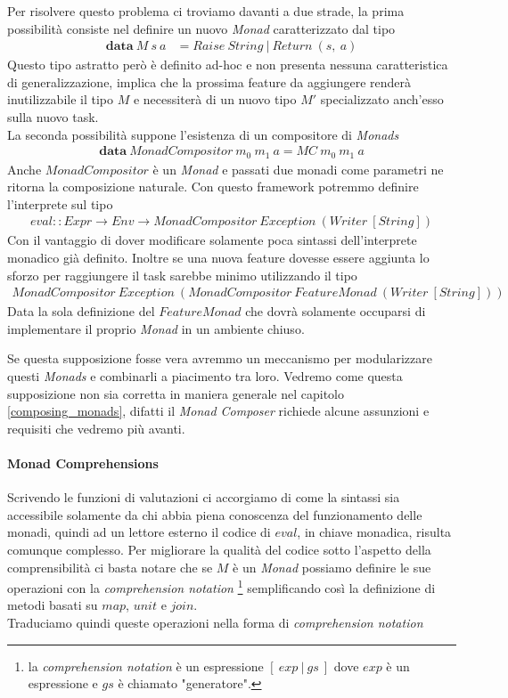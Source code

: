 Per risolvere questo problema ci troviamo davanti a due strade, la prima
possibilità consiste nel definire un nuovo \textit{Monad} caratterizzato dal
tipo
\begin{align*}
  \textbf{data}\ M\ s\ a &= Raise\ String\ |\ Return\ (s,\ a)
\end{align*}
Questo tipo astratto però è definito ad-hoc e non presenta nessuna
caratteristica di generalizzazione, implica che la prossima feature da
aggiungere renderà inutilizzabile il tipo $M$ e necessiterà di un nuovo tipo
$M'$ specializzato anch'esso sulla nuovo task.\\
La seconda possibilità suppone l'esistenza di un compositore di \textit{Monads}
\begin{align*}
  \textbf{data}\ MonadCompositor\ m_0\ m_1\ a = MC\ m_0\ m_1\ a
\end{align*}
Anche $MonadCompositor$ è un \textit{Monad} e passati due monadi come parametri
ne ritorna la composizione naturale.
Con questo framework potremmo definire l'interprete sul tipo
\begin{align*}
  eval :: Expr \to Env \to MonadCompositor\ Exception\ (Writer\ [String])
\end{align*}
Con il vantaggio di dover modificare solamente poca sintassi dell'interprete
monadico già definito.
Inoltre se una nuova feature dovesse essere aggiunta lo sforzo per raggiungere
il task sarebbe minimo utilizzando il tipo
\begin{align*}
  MonadCompositor\ Exception\ (MonadCompositor\ FeatureMonad\ (Writer\ [String]))
  \end{align*}
Data la sola definizione del $FeatureMonad$ che dovrà solamente occuparsi di
implementare il proprio \textit{Monad} in un ambiente chiuso.\newline

Se questa supposizione fosse vera avremmo un meccanismo per modularizzare
questi \textit{Monads} e combinarli a piacimento tra loro.
Vedremo come questa supposizione non sia corretta in maniera generale nel
capitolo \ref{composing_monads}, difatti il \textit{Monad Composer} richiede
alcune assunzioni e requisiti che vedremo più avanti.

\pagebreak
\paragraph*{Monad Comprehensions}
\label{monad_comprehensions}

Scrivendo le funzioni di valutazioni ci accorgiamo di come la sintassi sia
accessibile solamente da chi abbia piena conoscenza del funzionamento delle
monadi, quindi ad un lettore esterno il codice di $eval$, in chiave monadica,
risulta comunque complesso.
Per migliorare la qualità del codice sotto l'aspetto della comprensibilità ci
basta notare che se $M$ è un \textit{Monad} possiamo definire le sue operazioni
con la \textit{comprehension notation}
\footnote{la \textit{comprehension notation} è un espressione $[\ exp\ |\ gs\ ]$
dove $exp$ è un espressione e $gs$ è chiamato "generatore".}
semplificando così la definizione di metodi basati su $map$, $unit$ e $join$.\\
Traduciamo quindi queste operazioni nella forma di
\textit{comprehension notation}

